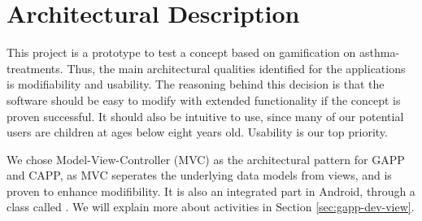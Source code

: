 \section{Architectural Description}

This project is a prototype to test a concept based
on gamification on asthma-treatments. Thus, the main architectural qualities 
identified for the applications is modifiability and usability. 
The reasoning behind this decision is that the software should be easy to modify with extended 
functionality if the concept is proven successful. 
It should
also be intuitive to use, since many of our potential users are children at ages below eight years old. Usability is our top priority.


We chose Model-View-Controller (MVC) as the architectural pattern for GAPP and CAPP, as MVC seperates the
underlying data models from views, and is proven to enhance modifibility. 
It is also an integrated part in Android, through a class called .
We will explain more about activities in Section \ref{sec:gapp-dev-view}.
  

